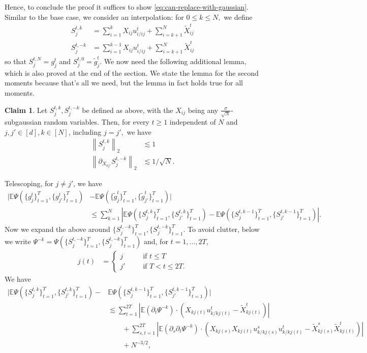 \documentclass{article}
\newcommand{\1}{\mathbbm{1}}
\newcommand{\norm}[1]{\left\lVert#1\right\rVert}
\theoremstyle{plain}
\theoremstyle{definition}
\newtheorem{claim}[theorem]{Claim}
\theoremstyle{remark}
\newcommand{\E}{\mathbb{E}}
\begin{document}
    Hence, to conclude the proof it suffices to show \eqref{eq:can-replace-with-gaussian}. Similar to the base case, we consider an interpolation: for $0\leq k\leq N,$ we define
    \begin{align*}
        S_j^{t,k} &= \sum_{i=1}^k X_{ij} u_{i/ij}^{t} + \sum_{i=k+1}^N \tilde{X}_{ij}^t \\
        S_j^{t,-k} &= \sum_{i=1}^{k-1} X_{ij} u_{i/ij}^{t}+ \sum_{i=k+1}^N \tilde{X}_{ij}^t 
    \end{align*}
    so that $S_j^{t,N}=g_j^t$ and $S_j^{t,0}=\tilde{g}_j^t$. We now need the following additional lemma, which is also proved at the end of the section. We state the lemma for the second moments because that's all we need, but the lemma in fact holds true for all moments.
    \begin{claim}\label{claim:recursive-claim-1}
        Let $S_{j}^{t,k}, S_{j}^{t,-k}$ be defined as above, with the $X_{ij}$ being any $\frac{\sigma}{\sqrt{N}}$-subgaussian random variables. Then, for every $t\geq 1$ independent of $N$ and $j,j' \in [d],k\in [N]$, including $j=j',$ we have 
        \begin{align*}
            \norm{S_j^{t,k}}_2 &\lesssim 1 \\
            \norm{\partial_{X_{kj'}}S_j^{t,-k}}_2 &\lesssim 1/\sqrt{N}.
        \end{align*}
    \end{claim}
    Telescoping, for $j\neq j'$, we have
    \begin{align*}
        |\E\Psi(\{g_j^t\}_{t=1}^T, \{g_{j'}^t\}_{t=1}^T)& - \E\Psi(\{\tilde{g}_j^t\}_{t=1}^T, \{\tilde{g}_{j'}^t\}_{t=1}^T)| \\
        &\leq \sum_{k=1}^N|\E\Psi(\{S_j^{t,k}\}_{t=1}^T, \{S_{j'}^{t,k}\}_{t=1}^T) - \E\Psi(\{S_j^{t,k-1}\}_{t=1}^T, \{S_{j'}^{t,k-1}\}_{t=1}^T)|.
    \end{align*}
    Now we expand the above around $\{S_j^{t,-k}\}_{t=1}^T, \{S_j^{t,-k}\}_{t=1}^T.$ To avoid clutter, below we write $\Psi^{-k} = \Psi(\{S_j^{t,-k}\}_{t=1}^T, \{S_j^{t,-k}\}_{t=1}^T)$ and, for $t=1,\dots,2T$,
    \begin{align*}
    j(t) &= \begin{cases}
        j \qquad &\text{if }t\leq T \\
        j' &\text{if }T<t\leq 2T.
    \end{cases}
    \end{align*}
    We have 
    \begin{align}
        |\E\Psi(\{S_j^{t,k}\}_{t=1}^T, \{S_{j'}^{t,k}\}_{t=1}^T) - &\E\Psi(\{S_j^{t,k-1}\}_{t=1}^T, \{S_{j'}^{t,k-1}\}_{t=1}^T)| \nonumber\\
        &\lesssim \sum_{t=1}^{2T} |\E (\partial_t \Psi^{-k})\cdot (X_{kj(t)}u_{k/kj(t)}^{t} - \tilde{X}^t_{kj(t)})| \nonumber\\
        &\qquad +\sum_{s,t=1}^{2T} | \E(\partial_{s}\partial_t \Psi^{-k})\cdot (X_{kj(s)}X_{kj(t)}u_{k/kj(s)}^{s}u_{k/kj(t)}^{t} - \tilde{X}^s_{kj(s)}\tilde{X}^t_{kj(t)})| \nonumber\\
        &\qquad + N^{-3/2},\label{eq:Psi-expansion}
    \end{align}
\end{document}
